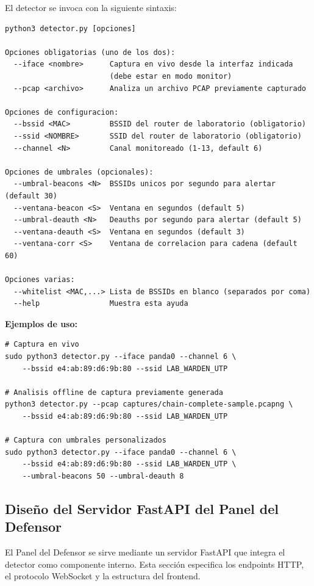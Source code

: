 \documentclass[11pt,a4paper]{article}
\begin{document}
El detector se invoca con la siguiente sintaxis:

\begin{lstlisting}
python3 detector.py [opciones]

Opciones obligatorias (uno de los dos):
  --iface <nombre>      Captura en vivo desde la interfaz indicada
                        (debe estar en modo monitor)
  --pcap <archivo>      Analiza un archivo PCAP previamente capturado

Opciones de configuracion:
  --bssid <MAC>         BSSID del router de laboratorio (obligatorio)
  --ssid <NOMBRE>       SSID del router de laboratorio (obligatorio)
  --channel <N>         Canal monitoreado (1-13, default 6)

Opciones de umbrales (opcionales):
  --umbral-beacons <N>  BSSIDs unicos por segundo para alertar (default 30)
  --ventana-beacon <S>  Ventana en segundos (default 5)
  --umbral-deauth <N>   Deauths por segundo para alertar (default 5)
  --ventana-deauth <S>  Ventana en segundos (default 3)
  --ventana-corr <S>    Ventana de correlacion para cadena (default 60)

Opciones varias:
  --whitelist <MAC,...> Lista de BSSIDs en blanco (separados por coma)
  --help                Muestra esta ayuda
\end{lstlisting}

\textbf{Ejemplos de uso:}

\begin{lstlisting}
# Captura en vivo
sudo python3 detector.py --iface panda0 --channel 6 \
    --bssid e4:ab:89:d6:9b:80 --ssid LAB_WARDEN_UTP

# Analisis offline de captura previamente generada
python3 detector.py --pcap captures/chain-complete-sample.pcapng \
    --bssid e4:ab:89:d6:9b:80 --ssid LAB_WARDEN_UTP

# Captura con umbrales personalizados
sudo python3 detector.py --iface panda0 --channel 6 \
    --bssid e4:ab:89:d6:9b:80 --ssid LAB_WARDEN_UTP \
    --umbral-beacons 50 --umbral-deauth 8
\end{lstlisting}

\subsection{Diseño del Servidor FastAPI del Panel del Defensor}

El Panel del Defensor se sirve mediante un servidor FastAPI que integra
el detector como componente interno. Esta sección especifica los
endpoints HTTP, el protocolo WebSocket y la estructura del frontend.
\end{document}
